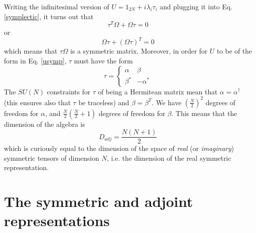 \documentclass[a4paper,10pt]{article}
\begin{document}
Writing the infinitesimal version of $U = 1_{2N} + i\lambda_i \tau_i$ and plugging it into 
Eq.\ref{symplectic}, it turns out that 
\begin{equation}
\tau^T \Omega + \Omega \tau = 0
\end{equation}
or
\begin{equation}
    \Omega \tau + (\Omega \tau)^T = 0
    \label{symp_generators_constraints}
\end{equation}
which means that $\tau \Omega$ is a symmetric matrix.
Moreover, in order for $U$ to be of the form in Eq. \ref{usymp},
$\tau$ must have the form
\begin{equation}
    \tau = \left\{
        \begin{array}{cc}
            \alpha & \beta \\
            \beta^\ast & -\alpha^\ast
        \end{array}
    \right. 
\end{equation}
The $SU(N)$ constraints for $\tau$ of being a Hermitean matrix 
mean that $\alpha = \alpha^\dagger$ (this ensures also that $\tau$ be traceless)
and $\beta = \beta^T$. We have $(\frac{N}{2})^2$ degrees of freedom for $\alpha$, and
$\frac{N}{2}\left(\frac{N}{2}+1\right)$ degrees of freedom for $\beta$. 
This means that the dimension of the algebra is 
\begin{equation}
 D_{adj} = \frac{N (N+1)}{2}
\end{equation}
which is curiously equal to the dimension of the space of \emph{real} 
(or \emph{imaginary}) symmetric tensors of dimension $N$, i.e. the dimension 
of the real symmetric representation.

\section{The symmetric and adjoint representations}
\end{document}
